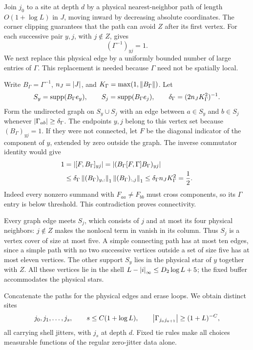 Join $j_0$ to a site at depth $d$ by a physical nearest-neighbor path
of length $O(1+\log L)$ in $J$, moving inward by decreasing absolute
coordinates. The corner clipping guarantees that the path can avoid
$Z$ after its first vertex. For each successive pair $y,j$, with
$j\notin Z$,  gives
\[
 (\Gamma^{-1})_{yj}=1.
\]
We next replace this physical edge by a uniformly bounded number of
large entries of $\Gamma$. This replacement is needed because
$\Gamma$ need not be spatially local.

Write $B_\Gamma=\Gamma^{-1}$, $n_J=\left\lvert J\right\rvert$, and
$K_\Gamma=\max(1,\left\lVert B_\Gamma\right\rVert)$. Let
\[
 S_y=\operatorname{supp}(B_\Gamma e_y),\qquad
 S_j=\operatorname{supp}(B_\Gamma e_j),\qquad
 \delta_\Gamma=(2n_JK_\Gamma^2)^{-1}.
\]
Form the undirected graph on $S_y\cup S_j$ with an edge between
$a\in S_y$ and $b\in S_j$ whenever
$\left\lvert\Gamma_{ab}\right\rvert\ge\delta_\Gamma$. The endpoints $y,j$ belong
to this vertex set because $(B_\Gamma)_{yj}=1$. If they were not
connected, let $F$ be the diagonal indicator of the component of $y$,
extended by zero outside the graph. The inverse commutator identity
would give
\begin{align*}
 1
 &=\left\lvert[F,B_\Gamma]_{yj}\right\rvert
   =\left\lvert(B_\Gamma[F,\Gamma]B_\Gamma)_{yj}\right\rvert\\
 &\le\delta_\Gamma
       \left\lVert(B_\Gamma)_{y,:}\right\rVert_1
       \left\lVert(B_\Gamma)_{:,j}\right\rVert_1
 \le\delta_\Gamma n_JK_\Gamma^2=\frac12.
\end{align*}
Indeed every nonzero summand with $F_{aa}\ne F_{bb}$ must cross
components, so its $\Gamma$ entry is below threshold. This
contradiction proves connectivity.

Every graph edge meets $S_j$, which consists of $j$ and at most its
four physical neighbors: $j\notin Z$ makes the nonlocal term in
 vanish in its column. Thus $S_j$ is a
vertex cover of size at most five. A simple connecting path has at
most ten edges, since a simple path with no two successive vertices
outside a set of size five has at most eleven vertices. The other
support $S_y$ lies in the physical star of $y$ together with $Z$.
All these vertices lie in the shell
$L-\left\lvert i\right\rvert_\infty\le D_2\log L+5$; the fixed buffer accommodates
the physical stars.

Concatenate the paths for the physical edges and erase loops. We
obtain distinct sites
\begin{equation}
 j_0,j_1,\ldots,j_s,\qquad
 s\le C(1+\log L),\qquad
 \left\lvert\Gamma_{j_a j_{a+1}}\right\rvert\ge(1+L)^{-C},
 \label{trans:resolvent-path}
\end{equation}
all carrying shell jitters, with $j_s$ at depth $d$. Fixed tie rules
make all choices measurable functions of the regular zero-jitter
data alone.


